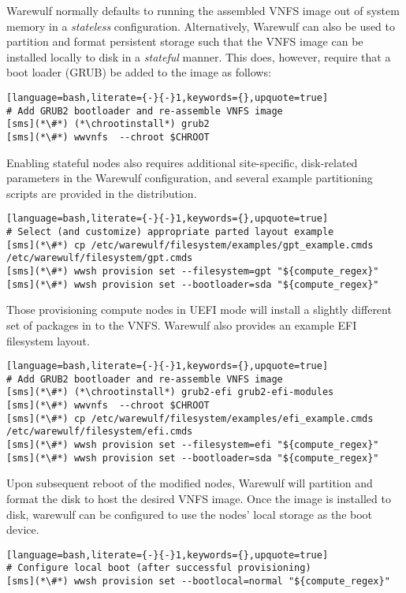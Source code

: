 Warewulf normally defaults to running the assembled VNFS image out of system
memory in a {\em stateless} configuration. Alternatively, Warewulf can also be
used to partition and format persistent storage such that the VNFS image can be
installed locally to disk in a {\em stateful} manner.  This does, however,
require that a boot loader (GRUB) be added to the image as follows:

\begin{lstlisting}[language=bash,literate={-}{-}1,keywords={},upquote=true]
# Add GRUB2 bootloader and re-assemble VNFS image
[sms](*\#*) (*\chrootinstall*) grub2
[sms](*\#*) wwvnfs  --chroot $CHROOT
\end{lstlisting}

\noindent Enabling stateful nodes also requires additional site-specific, disk-related
parameters in the Warewulf configuration, and several example partitioning scripts are 
provided in the distribution. 

\begin{lstlisting}[language=bash,literate={-}{-}1,keywords={},upquote=true]
# Select (and customize) appropriate parted layout example
[sms](*\#*) cp /etc/warewulf/filesystem/examples/gpt_example.cmds /etc/warewulf/filesystem/gpt.cmds
[sms](*\#*) wwsh provision set --filesystem=gpt "${compute_regex}" 
[sms](*\#*) wwsh provision set --bootloader=sda "${compute_regex}" 
\end{lstlisting}

\begin{center}
\begin{tcolorbox}[]
\small
Those provisioning compute nodes in UEFI mode will install a slightly different
set of packages in to the VNFS. Warewulf also provides an example EFI filesystem
layout.
\begin{lstlisting}[language=bash,literate={-}{-}1,keywords={},upquote=true]
# Add GRUB2 bootloader and re-assemble VNFS image
[sms](*\#*) (*\chrootinstall*) grub2-efi grub2-efi-modules
[sms](*\#*) wwvnfs  --chroot $CHROOT
[sms](*\#*) cp /etc/warewulf/filesystem/examples/efi_example.cmds /etc/warewulf/filesystem/efi.cmds
[sms](*\#*) wwsh provision set --filesystem=efi "${compute_regex}" 
[sms](*\#*) wwsh provision set --bootloader=sda "${compute_regex}" 
\end{lstlisting}
\end{tcolorbox}
\end{center}

\noindent Upon subsequent reboot of the modified nodes, Warewulf will partition
and format the disk to host the desired VNFS image.  Once the image is installed 
to disk, warewulf can be configured to use the nodes' local storage as the boot 
device.

\begin{lstlisting}[language=bash,literate={-}{-}1,keywords={},upquote=true]
# Configure local boot (after successful provisioning)
[sms](*\#*) wwsh provision set --bootlocal=normal "${compute_regex}"
\end{lstlisting}
